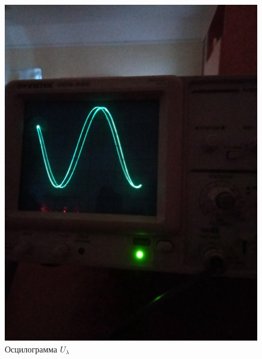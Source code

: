 \documentclass[a4paper, 12pt]{article}
\begin{document}
\begin{enumerate}
    \begin{figure}
        \includegraphics[scale=0.3]{pic2.jpg}
        \centering
        \caption{Осцилограмма $U_{\lambda}$}
        \label{pic2}
    \end{figure}


\end{enumerate}
\end{document}
